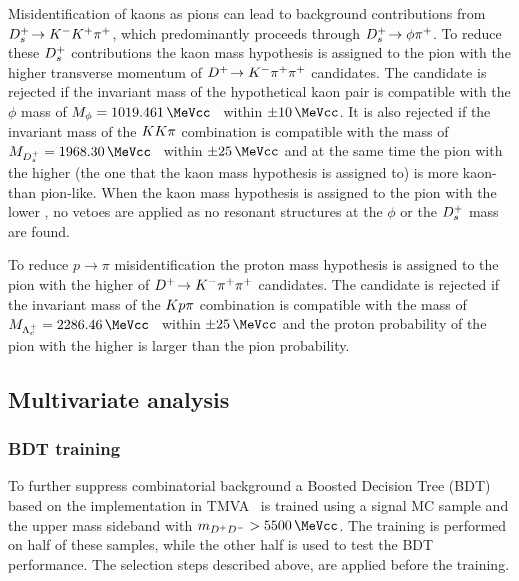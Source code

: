 Misidentification of kaons as pions can lead to background contributions from
\mbox{${{D}^+_{s}}\!\rightarrow {\ensuremath{{K}^-}}{\ensuremath{{K}^+}}{\ensuremath{{\pi}^+}}$}, which predominantly proceeds through ${{D}^+_{s}}\!\rightarrow \phi{\ensuremath{{\pi}^+}}$. To
reduce these ${{D}^+_{s}}$ contributions the kaon mass hypothesis is assigned to the
pion with the higher transverse momentum of ${{D}^+}\!\rightarrow {\ensuremath{{K}^-}}{\ensuremath{{\pi}^+}}{\ensuremath{{\pi}^+}}$ candidates. The
candidate is rejected if the invariant mass of the hypothetical kaon pair is
compatible with the $\phi$ mass of $M_{\phi} =
\SI{1019.461}{\MeVcc}$~\cite{PDG2014} within $\pm\SI{10}{\MeVcc}$. It is also
rejected if the invariant mass of the ${K}{K}{\pi}$ combination is
compatible with the \Dsp mass of $M_{\Dsp} =
\SI{1968.30}{\MeVcc}$~\cite{PDG2014} within $\pm\SI{25}{\MeVcc}$ and at the
same time the pion with the higher \pT (the one that the kaon mass hypothesis
is assigned to) is more kaon- than pion-like. When the kaon mass hypothesis is
assigned to the pion with the lower \pT, no vetoes are applied as no resonant
structures at the $\phi$ or the ${{D}^+_{s}}$ mass are found.

To reduce \mbox{$p\rightarrow\pi$} misidentification the proton mass
hypothesis is assigned to the pion with the higher \pT of ${{D}^+}\!\rightarrow {\ensuremath{{K}^-}}{\ensuremath{{\pi}^+}}{\ensuremath{{\pi}^+}}$
candidates. The candidate is rejected if the invariant mass of the
${K}{p}{\pi}$ combination is compatible with the \Lc mass of $M_{\Lc} =
\SI{2286.46}{\MeVcc}$~\cite{PDG2014} within $\pm\SI{25}{\MeVcc}$ and the
proton probability of the pion with the higher \pT is
larger than the pion probability.

\subsection{Multivariate analysis}
\label{sec:b02dd:selection:mva}

\subsubsection*{BDT training}
\label{sec:b02dd:selection:mva:training}

To further suppress combinatorial background a Boosted Decision Tree
(BDT)~\cite{Breiman,Roe} based on the implementation in
TMVA~\cite{Hocker:2007ht} is trained using a signal MC sample and the upper
mass sideband with $m_{\Dp\Dm} > \SI{5500}{\MeVcc}$. The training is performed
on half of these samples, while the other half is used to test the BDT
performance. The selection steps described above, are applied before the
training.

